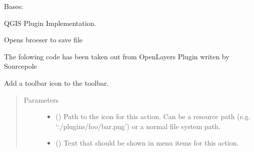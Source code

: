 \documentclass[letterpaper,10pt,english]{sphinxmanual}
\begin{document}
\begin{fulllineitems}
\label{\detokenize{code:Tilgjengelighet.Tilgjengelighet}}
Bases: 

QGIS Plugin Implementation.

\begin{fulllineitems}
\label{\detokenize{code:Tilgjengelighet.Tilgjengelighet.OpenBrowser}}
Opens broeser to save file

\end{fulllineitems}


\begin{fulllineitems}
\label{\detokenize{code:Tilgjengelighet.Tilgjengelighet.addLayer}}
The folowing code has been taken out from OpenLayers Plugin writen by Sourcepole

\end{fulllineitems}


\begin{fulllineitems}
\label{\detokenize{code:Tilgjengelighet.Tilgjengelighet.add_action}}
Add a toolbar icon to the toolbar.
\begin{quote}\begin{description}
\item[{Parameters}] \leavevmode\begin{itemize}
\item {} 
 () \textendash{} Path to the icon for this action. Can be a resource
path (e.g. ‘:/plugins/foo/bar.png’) or a normal file system path.

\item {} 
 () \textendash{} Text that should be shown in menu items for this action.


\end{itemize}
\end{description}
\end{quote}
\end{fulllineitems}
\end{fulllineitems}
\end{document}
